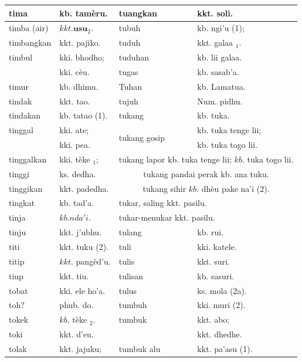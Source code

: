 \documentclass[10pt]{article}
\begin{document}
\begin{center}
\begin{tabular}{|l|l|l|l|}
\hline
tima & kb. tamèru. & tuangkan & kkt. soli. \\
\hline
timba (air) & \(k k t . \mathbf{u s u}_{2}\). & tubuh & kb. ngi'u (1); \\
\hline
timbangkan & kkt. pajiko. & tuduh & kkt. galaa \({ }_{1}\). \\
\hline
timbul & kki. bhodho; & tuduhan & kb. lii galaa. \\
\hline
 & kki. cèu. & tugas & kb. sasab'a. \\
\hline
timur & kb. dhimu. & Tuhan & kb. Lamatua. \\
\hline
tindak & kkt. tao. & tujuh & Num. pidhu. \\
\hline
tindakan & kb. tatao (1). & tukang & kb. tuka. \\
\hline
tinggal & kki. ate; & \multirow[t]{2}{*}{tukang gosip} & kb. tuka tenge lii; \\
\hline
 & kki. pea. &  & kb. tuka togo lii. \\
\hline
tinggalkan & kki. tèke \({ }_{1}\); & \multicolumn{2}{|l|}{tukang lapor kb. tuka tenge lii; \(k b\). tuka togo lii.} \\
\hline
tinggi & ks. dedha. & \multicolumn{2}{|c|}{tukang pandai perak kb. ana tuku.} \\
\hline
tinggikan & kkt. padedha. & \multicolumn{2}{|c|}{tukang sihir \(k b\). dhèu pake na'i (2).} \\
\hline
tingkat & kb. tad'a. & \multicolumn{2}{|l|}{tukar, saling kkt. pasilu.} \\
\hline
tinja & \(k b . n d a ' i\). & \multicolumn{2}{|l|}{tukar-menukar kkt. pasilu.} \\
\hline
tinju & kkt. j'ubhu. & tulang & kb. rui. \\
\hline
titi & kkt. tuku (2). & tuli & kki. katele. \\
\hline
titip & \(k k t\). pangèd'u. & tulis & kkt. suri. \\
\hline
tiup & kkt. tiu. & tulisan & kb. sasuri. \\
\hline
tobat & kki. ele ho'a. & tulus & ks. mola (2a). \\
\hline
toh? & phub. do. & tumbuh & kki. muri (2). \\
\hline
tokek & \(k b\). tèke \({ }_{2}\). & tumbuk & kkt. abo; \\
\hline
toki & kkt. d'eu. &  & kkt. dhedhe. \\
\hline
tolak & kkt. jajuku; & tumbuk alu & kkt. pa'asu (1). \\

\end{tabular}
\end{center}
\end{document}
